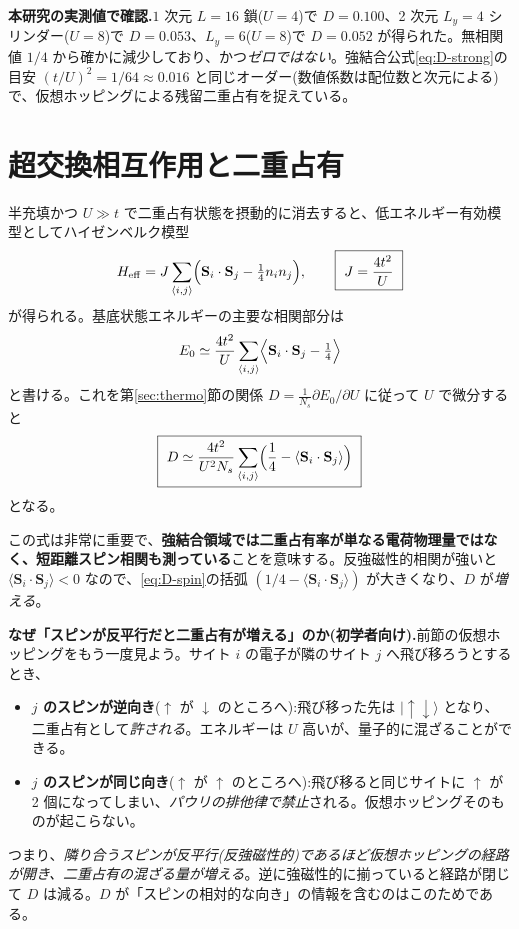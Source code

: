 \documentclass[11pt,a4paper]{ltjsarticle}
\newcommand{\ket}[1]{|#1\rangle}
\newcommand{\ev}[1]{\langle #1\rangle}
\newcommand{\up}{\uparrow}
\newcommand{\dn}{\downarrow}
\newcommand{\Sv}{\mathbf S}
\begin{document}
\begin{exbox}
\textbf{本研究の実測値で確認.}$1$ 次元 $L=16$ 鎖($U=4$)で $D=0.100$、2 次元 $L_y=4$ シリンダー($U=8$)で $D=0.053$、$L_y=6$($U=8$)で $D=0.052$ が得られた。無相関値 $1/4$ から確かに減少しており、かつ\emph{ゼロではない}。強結合公式\eqref{eq:D-strong}の目安 $(t/U)^2=1/64\approx0.016$ と同じオーダー(数値係数は配位数と次元による)で、仮想ホッピングによる残留二重占有を捉えている。
\end{exbox}

\section{超交換相互作用と二重占有}
\label{sec:superexchange}

半充填かつ $U\gg t$ で二重占有状態を摂動的に消去すると、低エネルギー有効模型としてハイゼンベルク模型
\begin{equation}
  H_{\rm eff} = J\sum_{\langle i,j\rangle}\Bigl(\Sv_i\cdot\Sv_j-\tfrac14 n_in_j\Bigr),
  \qquad \boxed{\ J=\frac{4t^2}{U}\ }
\end{equation}
が得られる。基底状態エネルギーの主要な相関部分は
\begin{equation}
  E_0 \simeq \frac{4t^2}{U}\sum_{\langle i,j\rangle}\Bigl\langle \Sv_i\cdot\Sv_j-\tfrac14\Bigr\rangle
\end{equation}
と書ける。これを第\ref{sec:thermo}節の関係 $D=\frac{1}{N_s}\partial E_0/\partial U$ に従って $U$ で微分すると
\begin{equation}
  \boxed{\ D \simeq \frac{4t^2}{U^2N_s}\sum_{\langle i,j\rangle}\Bigl(\frac14-\ev{\Sv_i\cdot\Sv_j}\Bigr)\ }
  \label{eq:D-spin}
\end{equation}
となる。

この式は非常に重要で、\textbf{強結合領域では二重占有率が単なる電荷物理量ではなく、短距離スピン相関も測っている}ことを意味する。反強磁性的相関が強いと $\ev{\Sv_i\cdot\Sv_j}<0$ なので、\eqref{eq:D-spin}の括弧 $(1/4-\ev{\Sv_i\cdot\Sv_j})$ が大きくなり、$D$ が\emph{増える}。

\begin{keybox}
\textbf{なぜ「スピンが反平行だと二重占有が増える」のか(初学者向け).}前節の仮想ホッピングをもう一度見よう。サイト $i$ の電子が隣のサイト $j$ へ飛び移ろうとするとき、
\begin{itemize}\itemsep2pt
  \item \textbf{$j$ のスピンが逆向き}($\up$ が $\dn$ のところへ):飛び移った先は $\ket{\up\dn}$ となり、二重占有として\emph{許される}。エネルギーは $U$ 高いが、量子的に混ざることができる。
  \item \textbf{$j$ のスピンが同じ向き}($\up$ が $\up$ のところへ):飛び移ると同じサイトに $\up$ が 2 個になってしまい、\emph{パウリの排他律で禁止}される。仮想ホッピングそのものが起こらない。
\end{itemize}
つまり、\emph{隣り合うスピンが反平行(反強磁性的)であるほど仮想ホッピングの経路が開き、二重占有の混ざる量が増える}。逆に強磁性的に揃っていると経路が閉じて $D$ は減る。$D$ が「スピンの相対的な向き」の情報を含むのはこのためである。
\end{keybox}
\end{document}
